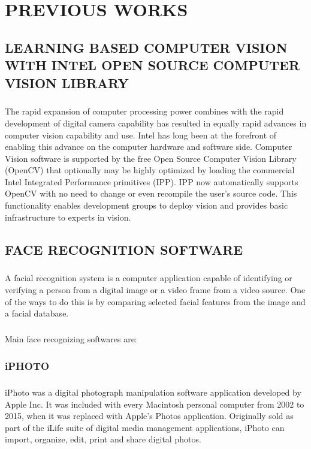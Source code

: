 \documentclass[11pt,a4paper,twoside]{report}
\begin{document}
\chapter{PREVIOUS WORKS}

\section{LEARNING BASED COMPUTER VISION WITH INTEL OPEN SOURCE COMPUTER VISION LIBRARY}
\paragraph{ }The rapid expansion of computer processing power combines with the rapid development of digital camera capability has resulted in equally rapid advances in computer vision capability and use. Intel has long been at the forefront of enabling this advance on the computer hardware and software side. Computer Vision software is supported by the free Open Source Computer Vision Library (OpenCV) that optionally may be highly optimized by loading the commercial Intel Integrated Performance primitives (IPP). IPP now automatically supports OpenCV with no need to change  or even recompile the user’s source code. This functionality enables development groups to deploy vision and provides basic infrastructure to experts in vision.

\section{FACE RECOGNITION SOFTWARE}
\paragraph{ }A facial recognition system is a computer application capable of identifying or verifying a person from a digital image or a video frame from a video source. One of the ways to do this is by comparing selected facial features from the image and a facial database.
\paragraph{ }Main face recognizing softwares are:
\subsection{iPHOTO}
\paragraph{ }iPhoto was a digital photograph manipulation software application developed by Apple Inc. It was included with every Macintosh personal computer from 2002 to 2015, when it was replaced with Apple's Photos application. Originally sold as part of the iLife suite of digital media management applications, iPhoto can import, organize, edit, print and share digital photos.
\end{document}
